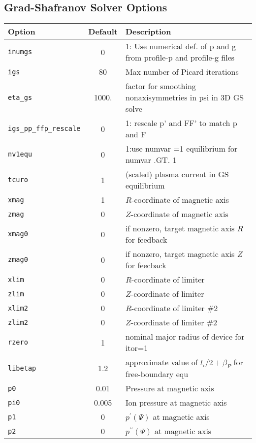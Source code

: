 \begin{tabular}{llp{4in}}
\end{tabular}

\subsection{Grad-Shafranov Solver Options}
\begin{tabular}{lcp{4in}}
  \textbf{Option}&\textbf{Default}&\textbf{Description}\\
  \hline
  \texttt{inumgs}& 0      & 1: Use numerical def. of p and g from profile-p and profile-g files\\
 \texttt{igs}   & 80     & Max number of Picard iterations\\
  \texttt{eta\_gs} & 1000.& factor for smoothing nonaxisymmetries in psi in 3D GS solve \\
  \texttt{igs\_pp\_ffp\_rescale} & 0 & 1: rescale p' and FF' to match p and F \\
  \texttt{nv1equ}& 0 & 1:use numvar =1 equilibrium for numvar .GT. 1 \\
  \texttt{tcuro} & 1	  & (scaled) plasma current in GS equilibrium\\
  \texttt{xmag}  & 1      & $R$-coordinate of magnetic axis\\
  \texttt{zmag}  & 0      & $Z$-coordinate of magnetic axis\\
  \texttt{xmag0} & 0      &  if nonzero, target magnetic axis $R$ for feedback\\
  \texttt{zmag0} & 0      &  if nonzero, target magnetic axis $Z$ for feecback\\
  \texttt{xlim}  & 0      & $R$-coordinate of limiter\\
  \texttt{zlim}  & 0      & $Z$-coordinate of limiter\\
  \texttt{xlim2}  & 0      & $R$-coordinate of limiter \#2\\
  \texttt{zlim2}  & 0	   & $Z$-coordinate of limiter \#2\\
  \texttt{rzero}  & 1      & nominal major radius of device for itor=1 \\
  \texttt{libetap}& 1.2    & approximate value of $l_i/2 + \beta_P$ for free-boundary equ \\
  \texttt{p0}    & 0.01   & Pressure at magnetic axis\\
  \texttt{pi0}   & 0.005  & Ion pressure at magnetic axis\\
  \texttt{p1}    & 0     & $p^{\prime}(\Psi)$ at magnetic axis\\
  \texttt{p2}    & 0     & $p^{\prime \prime}(\Psi)$ at magnetic axis\\

\end{tabular}
